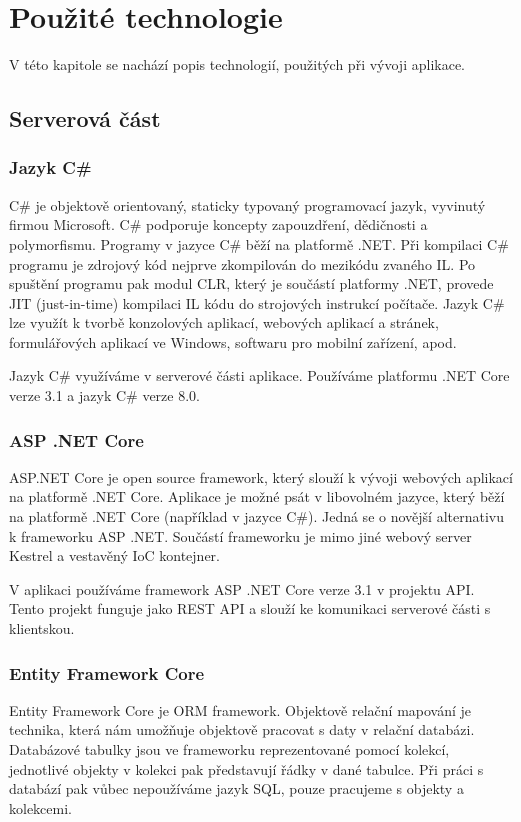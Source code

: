 
\chapter{Použité technologie}

V této kapitole se nachází popis technologií, použitých při vývoji aplikace.

\section{Serverová část}

\subsection{Jazyk C\#}
C\# je objektově orientovaný, staticky typovaný programovací jazyk, vyvinutý firmou Microsoft.
C\# podporuje koncepty zapouzdření, dědičnosti a polymorfismu. Programy v jazyce C\# běží na platformě .NET. 
Při kompilaci C\# programu je zdrojový kód nejprve zkompilován do mezikódu zvaného IL. 
Po spuštění programu pak modul CLR, který je součástí platformy .NET, provede JIT (just-in-time) kompilaci IL kódu do strojových instrukcí počítače.
Jazyk C\# lze využít k tvorbě konzolových aplikací, webových aplikací a stránek, formulářových aplikací ve Windows, softwaru pro mobilní zařízení, apod. 
\cite{CSharpDocs}

Jazyk C\# využíváme v serverové části aplikace. Používáme platformu .NET Core verze 3.1 a jazyk C\# verze 8.0.

\subsection{ASP .NET Core}
ASP.NET Core je open source framework, který slouží k vývoji webových aplikací na platformě .NET Core. Aplikace je možné psát v libovolném jazyce, který běží na platformě .NET Core (například v jazyce C\#). Jedná se o novější alternativu k frameworku ASP .NET. Součástí frameworku je mimo jiné webový server Kestrel a vestavěný IoC kontejner.
\cite{AspNetCoreDocs}

V aplikaci používáme framework ASP .NET Core verze 3.1 v projektu API. Tento projekt funguje jako REST API a slouží ke komunikaci serverové části s klientskou.

\subsection{Entity Framework Core}
Entity Framework Core je ORM framework. Objektově relační mapování je technika, která nám umožňuje objektově pracovat s daty v relační databázi. Databázové tabulky jsou ve frameworku reprezentované pomocí kolekcí, jednotlivé objekty v kolekci pak představují řádky v dané tabulce. Při práci s databází pak vůbec nepoužíváme jazyk SQL, pouze pracujeme s objekty a kolekcemi.
\cite{EfCoreDocs}

